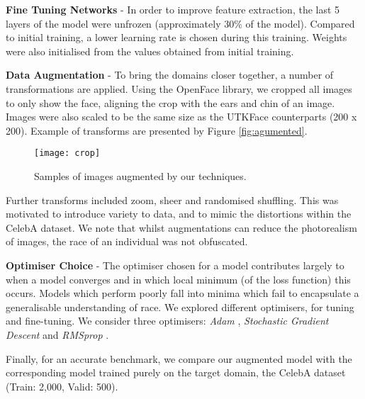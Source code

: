 \documentclass[10pt,twocolumn,letterpaper]{article}
\begin{document}
\textbf{Fine Tuning Networks} - In order to improve feature extraction, the last 5 layers of the model were unfrozen (approximately 30\% of the model). Compared to initial training, a lower learning rate is chosen during this training. Weights were also initialised from the values obtained from initial training. 

\textbf{Data Augmentation} - To bring the domains closer together, a number of transformations are applied. Using the OpenFace library, we cropped all images to only show the face, aligning the crop with the ears and chin of an image. Images were also scaled to be the same size as the UTKFace counterparts (200 x 200). Example of transforms are presented by Figure \ref{fig:agumented}.

\begin{figure}[ht]
\begin{center}
   \texttt{[image: crop]}
\end{center}
   \caption{ \label{fig:agumented} Samples of images augmented by our techniques.}
\label{fig:augmented}
\end{figure}

Further transforms included zoom, sheer and randomised shuffling. This was motivated to introduce variety to data, and to mimic the distortions within the CelebA dataset. We note that whilst augmentations can reduce the photorealism of images, the race of an individual was not obfuscated.

\textbf{Optimiser Choice} - The optimiser chosen for a model contributes largely to when a model converges and in which local minimum (of the loss function) this occurs. Models which perform poorly fall into minima which fail to encapsulate a generalisable understanding of race. We explored different optimisers, for tuning and fine-tuning. We consider three optimisers: \textit{Adam} \cite{DBLP:journals/corr/KingmaB14}, \textit{Stochastic Gradient Descent}\cite{robbins1951} and \textit{RMSprop} \cite{hinton2012neural}. 


Finally, for an accurate benchmark, we compare our augmented model with the corresponding model trained purely on the target domain, the CelebA dataset (Train: 2,000, Valid: 500).
\end{document}
